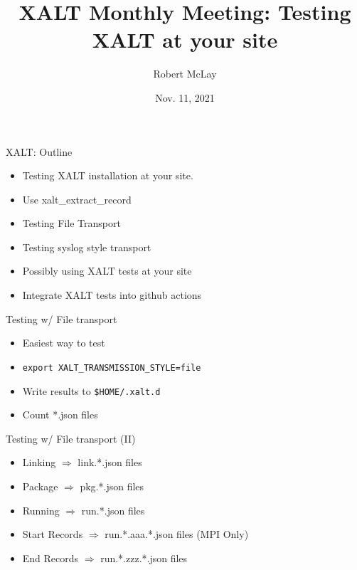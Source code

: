 \documentclass{beamer}
\begin{document}
\title[XALT]{XALT Monthly Meeting: Testing XALT at your site}
\author{Robert McLay} 
\date{Nov. 11, 2021} 

\frame{\titlepage} 

\begin{frame}{XALT: Outline}
  \begin{itemize}
    \item Testing XALT installation at your site.
    \item Use xalt\_extract\_record 
    \item Testing File Transport
    \item Testing syslog style transport
    \item Possibly using XALT tests at your site
    \item Integrate XALT tests into github actions
  \end{itemize}
\end{frame}

\begin{frame}{Testing w/ File transport}
  \begin{itemize}
    \item Easiest way to test
    \item \texttt{export XALT\_TRANSMISSION\_STYLE=file}
    \item Write results to \texttt{\$HOME/.xalt.d}
    \item Count *.json files
  \end{itemize}
\end{frame}

\begin{frame}{Testing w/ File transport (II)}
  \begin{itemize}
    \item Linking $\Rightarrow$ link.*.json files 
    \item Package $\Rightarrow$ pkg.*.json files 
    \item Running $\Rightarrow$ run.*.json files 
    \item Start Records $\Rightarrow$ run.*.aaa.*.json files (MPI Only)
    \item End Records $\Rightarrow$ run.*.zzz.*.json files 
  \end{itemize}
\end{frame}
\end{document}
